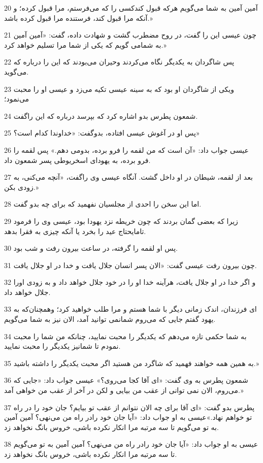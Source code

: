 \par 20 آمین آمین به شما می‌گویم هر‌که قبول کندکسی را که می‌فرستم، مرا قبول کرده؛ و آنکه مرا قبول کند، فرستنده مرا قبول کرده باشد.»
\par 21 چون عیسی این را گفت، در روح مضطرب گشت و شهادت داده، گفت: «آمین آمین به شمامی گویم که یکی از شما مرا تسلیم خواهد کرد.»
\par 22 پس شاگردان به یکدیگر نگاه می‌کردند وحیران می‌بودند که این را درباره که می‌گوید.
\par 23 ویکی از شاگردان او بود که به سینه عیسی تکیه می‌زد و عیسی او را محبت می‌نمود؛
\par 24 شمعون پطرس بدو اشاره کرد که بپرسد درباره که این راگفت.
\par 25 پس او در آغوش عیسی افتاده، بدوگفت: «خداوندا کدام است؟»
\par 26 عیسی جواب داد: «آن است که من لقمه را فرو برده، بدومی دهم.» پس لقمه را فرو برده، به یهودای اسخریوطی پسر شمعون داد.
\par 27 بعد از لقمه، شیطان در او داخل گشت. آنگاه عیسی وی راگفت، «آنچه می‌کنی، به زودی بکن.»
\par 28 اما این سخن را احدی از مجلسیان نفهمید که برای چه بدو گفت.
\par 29 زیرا که بعضی گمان بردند که چون خریطه نزد یهودا بود، عیسی وی را فرمود تامایحتاج عید را بخرد یا آنکه چیزی به فقرا بدهد.
\par 30 پس او لقمه را گرفته، در ساعت بیرون رفت و شب بود.
\par 31 چون بیرون رفت عیسی گفت: «الان پسر انسان جلال یافت و خدا در او جلال یافت.
\par 32 و اگر خدا در او جلال یافت، هرآینه خدا او را در خود جلال خواهد داد و به زودی اورا جلال خواهد داد.
\par 33 ‌ای فرزندان، اندک زمانی دیگر با شما هستم و مرا طلب خواهید کرد؛ وهمچنان‌که به یهود گفتم جایی که می‌روم شمانمی توانید آمد، الان نیز به شما می‌گویم.
\par 34 به شما حکمی تازه می‌دهم که یکدیگر را محبت نمایید، چنانکه من شما را محبت نمودم تا شمانیز یکدیگر را محبت نمایید.
\par 35 به همین همه خواهند فهمید که شاگرد من هستید اگر محبت یکدیگر را داشته باشید.»
\par 36 شمعون پطرس به وی گفت: «ای آقا کجا می‌روی؟» عیسی جواب داد: «جایی که می‌روم، الان نمی توانی از عقب من بیایی و لکن در آخر از عقب من خواهی آمد.»
\par 37 پطرس بدو گفت: «ای آقا برای چه الان نتوانم از عقب تو بیایم؟ جان خود را در راه تو خواهم نهاد.»عیسی به او جواب داد: «آیا جان خود رادر راه من می‌نهی؟ آمین آمین به تو می‌گویم تا سه مرتبه مرا انکار نکرده باشی، خروس بانگ نخواهد زد.
\par 38 عیسی به او جواب داد: «آیا جان خود رادر راه من می‌نهی؟ آمین آمین به تو می‌گویم تا سه مرتبه مرا انکار نکرده باشی، خروس بانگ نخواهد زد.

